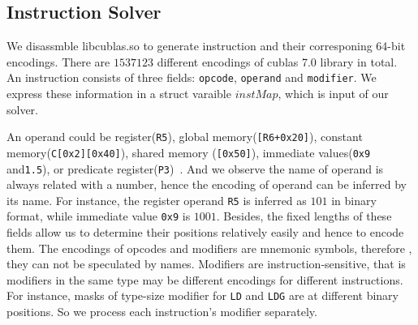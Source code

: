 \subsection{Instruction Solver}

We disassmble libcublas.so to generate instruction and their corresponing 64-bit encodings. There are $1537123$ different encodings of cublas 7.0 library in total.
An instruction consists of three fields: {\tt opcode}, {\tt operand} and {\tt modifier}. We express these information in a struct
varaible $instMap$, which is input of our solver.

An operand could be register({\tt R5}), 
global memory({\tt [R6+0x20]}), constant memory({\tt C[0x2][0x40]}), shared memory ({\tt [0x50]}),
immediate values({\tt 0x9} and{\tt1.5}), or predicate register({\tt P3})~\cite{ptx2015isa}. %
And we observe the name of operand is always related with a number, hence the encoding of operand can be inferred by its name.
For instance, the register operand {\tt R5} is inferred as $101$ in binary format, while immediate value {\tt 0x9} is $1001$. 
Besides, the fixed lengths of these fields allow us to determine their positions  relatively easily and hence to encode them. 
The encodings of opcodes and modifiers are mnemonic symbols, therefore
, they can not be speculated by names. 
Modifiers are instruction-sensitive, that is modifiers in the same type may be different encodings for different instructions. 
For instance, masks of type-size
modifier for {\tt LD} and {\tt LDG} are at different binary positions. So we process each instruction's modifier separately. 


